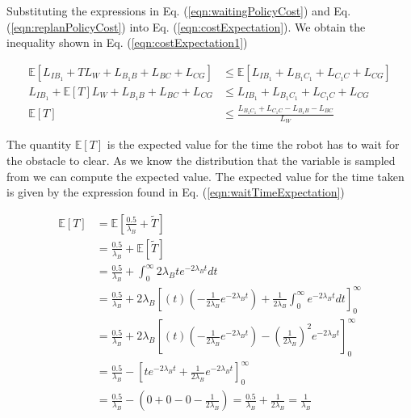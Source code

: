 \documentclass[a4paper,12pt]{article}
\begin{document}
			Substituting the expressions in Eq. (\ref{eqn:waitingPolicyCost}) and Eq. (\ref{eqn:replanPolicyCost}) into Eq. (\ref{eqn:costExpectation}). We obtain the inequality shown in Eq. (\ref{eqn:costExpectation1})
			
			\begin{equation}
			\begin{split}
			\mathbb{E}\left[L_{IB_{1}} + TL_W + L_{B_{1}B} + L_{BC} + L_{CG}\right] & \leq \mathbb{E}\left[L_{IB_{1}} + L_{B_{1}C_{1}} + L_{C_{1}C} + L_{CG}\right] \\
			L_{IB_{1}} + \mathbb{E}\left[T\right] L_W + L_{B_{1}B} + L_{BC} + L_{CG} & \leq L_{IB_{1}} + L_{B_{1}C_{1}} + L_{C_{1}C} + L_{CG} \\
			\mathbb{E}\left[T\right] & \leq \frac{L_{B_{1}C_{1}} + L_{C_{1}C} - L_{B_{1}B} - L_{BC}}{L_W}
			\end{split}
			\label{eqn:costExpectation1}
			\end{equation}
			
			The quantity $\mathbb{E}\left[T\right]$ is the expected value for the time the robot has to wait for the obstacle to clear. As we know the distribution that the variable is sampled from we can compute the expected value. The expected value for the time taken is given by the expression found in Eq. (\ref{eqn:waitTimeExpectation})
			
			\begin{equation}
			\begin{split}
				\mathbb{E}\left[T\right] & = \mathbb{E}\left[\frac{0.5}{\lambda_{B}}+\widetilde{T}\right] \\
				& = \frac{0.5}{\lambda_{B}} + \mathbb{E}\left[\widetilde{T}\right] \\
				& = \frac{0.5}{\lambda_{B}} + \int_{0}^{\infty}2\lambda_{B}te^{-2\lambda_{B}t} dt \\
				& = \frac{0.5}{\lambda_{B}} + 2\lambda_{B}\left[\left(t\right) \left(-\frac{1}{2\lambda_{B}}e^{-2\lambda_{B}t}\right) + \frac{1}{2\lambda_{B}} \int_{0}^{\infty}e^{-2\lambda_{B}t} dt \right]_{0}^{\infty} \\
				& = \frac{0.5}{\lambda_{B}} + 2\lambda_{B}\left[\left(t\right) \left(-\frac{1}{2\lambda_{B}}e^{-2\lambda_{B}t}\right) - \left(\frac{1}{2\lambda_{B}}\right)^2 e^{-2\lambda_{B}t} \right]_{0}^{\infty} \\
				& = \frac{0.5}{\lambda_{B}} - \left[te^{-2\lambda_{B}t} + \frac{1}{2\lambda_{B}} e^{-2\lambda_{B}t} \right]_{0}^{\infty} \\
				& = \frac{0.5}{\lambda_{B}} - (0 + 0 - 0 - \frac{1}{2\lambda_{B}}) = \frac{0.5}{\lambda_{B}} + \frac{1}{2\lambda_{B}} = \frac{1}{\lambda_{B}}
			\end{split}
			\label{eqn:waitTimeExpectation}
			\end{equation}
			
\end{document}
